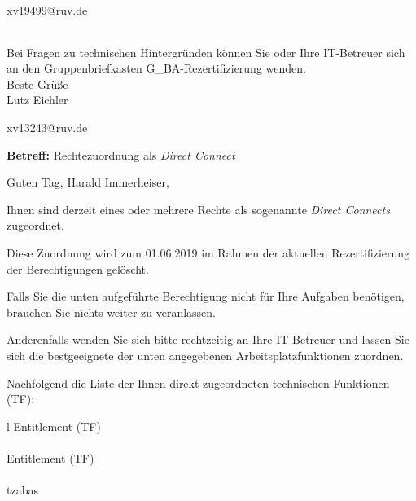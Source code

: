 \documentclass[a4paper,landscape,12pt]{letter}
\begin{document}
\begin{letter}{xv19499@ruv.de\hfill \break}
\begin{tiny}
\begin{longtable}{|p{35mm}|p{15mm}|p{25mm}|p{10mm}|p{40mm}|p{50mm}|p{50mm}|}
\hline
		\end{longtable}
		\end{tiny}
	
\begin{minipage}{\textwidth}
			Bei Fragen zu technischen Hintergründen können Sie 
			oder Ihre IT-Betreuer sich an den Gruppenbriefkasten 
			G\_BA-Rezertifizierung
			wenden.\\
			\linebreak
			Beste Grüße\\
			Lutz Eichler
	\end{minipage}
	\end{letter}
	
\begin{letter}{xv13243@ruv.de\hfill \break}
\begin{normalsize}
	\opening{\textbf{Betreff:} Rechtezuordnung als \emph{Direct Connect}}
	\begin{normalsize} \hfill
	\end{normalsize}

	\begin{normalsize}
		Guten Tag, 
	Harald Immerheiser, \hfill \break
	\end{normalsize}
	\end{normalsize}
	
\begin{normalsize}
	Ihnen sind derzeit eines oder mehrere Rechte als sogenannte \emph{Direct Connects} zugeordnet.
	
	Diese Zuordnung wird zum 01.06.2019 im Rahmen der aktuellen Rezertifizierung der Berechtigungen gelöscht.
	
	Falls Sie die unten aufgeführte Berechtigung nicht für Ihre Aufgaben benötigen, 
	brauchen Sie nichts weiter zu veranlassen.
	
	Anderenfalls wenden Sie sich bitte rechtzeitig an Ihre IT-Betreuer 
	und lassen Sie sich die bestgeeignete der unten angegebenen Arbeitsplatzfunktionen zuordnen.
	\end{normalsize}
	
\begin{normalsize}
	Nachfolgend die Liste der Ihnen direkt zugeordneten technischen Funktionen (TF):

	\begin{longtable}{l}
		Entitlement (TF) \\ \hline
		\endfirsthead
		\\\hline
		Entitlement (TF) \\ \hline
		\endhead %
		\multicolumn{1}{r@{}}{Fortsetzung \ldots}\\
		\endfoot
		\hline
		\endlastfoot
	tzabas\\
	\end{longtable}
	\end{normalsize}
	

\end{letter}
\end{document}
